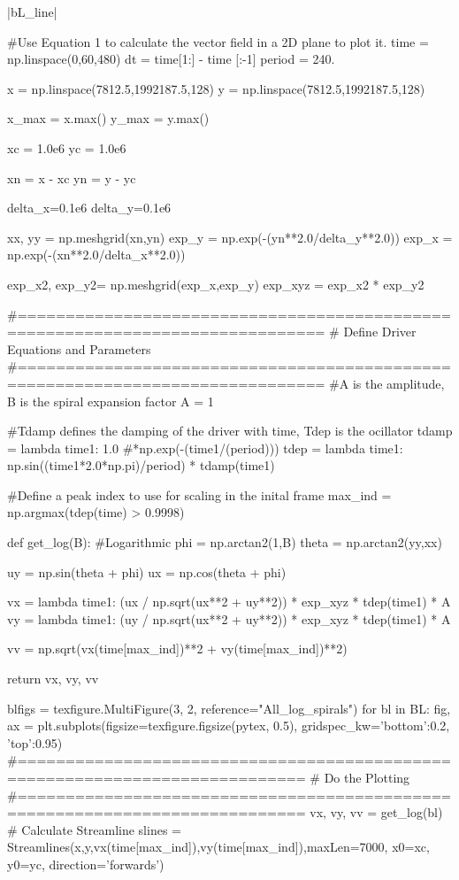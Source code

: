 \py[chapter5]|bL_line|

\begin{pycode}[chapter5]
#Use Equation 1 to calculate the vector field in a 2D plane to plot it.
time = np.linspace(0,60,480)
dt = time[1:] - time [:-1]
period = 240.

x = np.linspace(7812.5,1992187.5,128)
y = np.linspace(7812.5,1992187.5,128)

x_max = x.max()
y_max = y.max()

xc = 1.0e6
yc = 1.0e6

xn = x - xc
yn = y - yc

delta_x=0.1e6
delta_y=0.1e6

xx, yy = np.meshgrid(xn,yn)
exp_y = np.exp(-(yn**2.0/delta_y**2.0))
exp_x = np.exp(-(xn**2.0/delta_x**2.0))

exp_x2, exp_y2= np.meshgrid(exp_x,exp_y)
exp_xyz = exp_x2 * exp_y2


#==============================================================================
# Define Driver Equations and Parameters
#==============================================================================
#A is the amplitude, B is the spiral expansion factor
A = 1

#Tdamp defines the damping of the driver with time, Tdep is the ocillator
tdamp = lambda time1: 1.0 #*np.exp(-(time1/(period)))
tdep = lambda time1: np.sin((time1*2.0*np.pi)/period) * tdamp(time1)

#Define a peak index to use for scaling in the inital frame
max_ind = np.argmax(tdep(time) > 0.9998)

def get_log(B):
    #Logarithmic
    phi = np.arctan2(1,B)
    theta = np.arctan2(yy,xx)
    
    uy = np.sin(theta + phi)
    ux =  np.cos(theta + phi)
    
    vx = lambda time1: (ux / np.sqrt(ux**2 + uy**2)) * exp_xyz * tdep(time1) * A
    vy = lambda time1: (uy / np.sqrt(ux**2 + uy**2)) * exp_xyz * tdep(time1) * A
    
    vv = np.sqrt(vx(time[max_ind])**2 + vy(time[max_ind])**2)
    
    return vx, vy, vv

blfigs = texfigure.MultiFigure(3, 2, reference="All_log_spirals")
for bl in BL:
    fig, ax = plt.subplots(figsize=texfigure.figsize(pytex, 0.5),
                           gridspec_kw={'bottom':0.2, 'top':0.95})
    #============================================================================
    # Do the Plotting
    #============================================================================
    vx, vy, vv = get_log(bl)
    # Calculate Streamline
    slines = Streamlines(x,y,vx(time[max_ind]),vy(time[max_ind]),maxLen=7000,
    x0=xc, y0=yc, direction='forwards')
    

\end{pycode}
